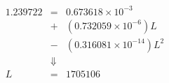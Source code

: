 

\begin{eqnarray*}
1.239722 & = & 0.673618\times10^{-3}  \\
         & + & (0.732059\times10^{-6})L  \\
         & - & (0.316081\times10^{-14})L^2  \\
         &   \Downarrow & \\
      L  & = &  1705106
\end{eqnarray*}


